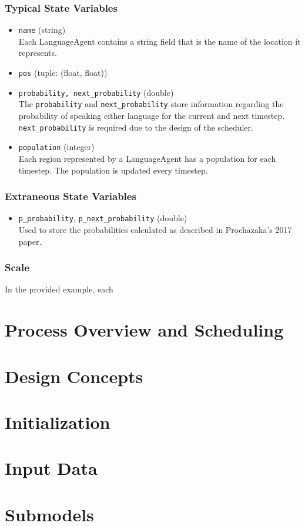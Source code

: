 \documentclass{article}
\begin{document}
\subsubsection{Typical State Variables}
\begin{itemize}
\item \texttt{name} (string)\\
Each LanguageAgent contains a string field that is the name of the location it represents.

\item \texttt{pos} (tuple: (float, float)) \\


\item \texttt{probability, next\_probability} (double) \\
The \texttt{probability} and \texttt{next\_probability} store information regarding the probability of speaking either language for the current and next timestep. \texttt{next\_probability} is required due to the design of the scheduler.

\item \texttt{population} (integer) \\
Each region represented by a LanguageAgent has a population for each timestep. The population is updated every timestep.

\end{itemize}

\subsubsection{Extraneous State Variables}
\begin{itemize}
\item \texttt{p\_probability}, \texttt{p\_next\_probability} (double) \\
Used to store the probabilities calculated as described in Prochazaka's 2017 paper.

\end{itemize}

\subsubsection{Scale}

In the provided example, each 

\section{Process Overview and Scheduling}

\section{Design Concepts}

 \section{Initialization}

\section{Input Data}

\section{Submodels}
\end{document}
